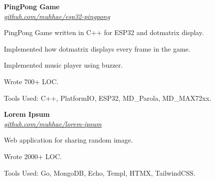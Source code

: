     \begin{twocolentry}{
    }
    \textbf{PingPong Game}\\
    \textit{\href{https://github.com/muhhae/esp32-pingpong}{github.com/muhhae/esp32-pingpong}}
    \end{twocolentry}

    \vspace{0.10 cm}
    \begin{onecolentry}
        \begin{highlights}
            \item PingPong Game written in C++ for ESP32 and dotmatrix display.
            \item Implemented how dotmatrix displays every frame in the game.
            \item Implemented music player using buzzer.
            \item Wrote 700+ LOC.
            \item Tools Used: C++, PlatformIO, ESP32, MD\_Parola, MD\_MAX72xx.
        \end{highlights}
    \end{onecolentry}

    \vspace{0.2 cm}

    \begin{twocolentry}{
    }
    \textbf{Lorem Ipsum}\\
    \textit{\href{https://github.com/muhhae/lorem-ipsum}{github.com/muhhae/lorem-ipsum}}
    \end{twocolentry}

    \vspace{0.10 cm}
    \begin{onecolentry}
        \begin{highlights}
            \item Web application for sharing random image.
            \item Wrote 2000+ LOC.
            \item Tools Used: Go, MongoDB, Echo, Templ, HTMX, TailwindCSS.
        \end{highlights}
    \end{onecolentry}
